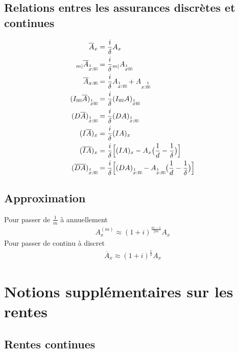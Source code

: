 \documentclass[11pt,french]{report}
\makeatletter
\DeclareRobustCommand{\annuity}[1]{%
\def\arraystretch{0}%
\setlength\arraycolsep{.7pt}%
\setlength\arrayrulewidth{.3pt}%
\begin{array}[b]{@{}c|}\hline
\\[\arraycolsep]%
\scriptstyle #1%
\end{array}%
}
\newcommand{\indiceGauche}[2]{{\vphantom{#2}}_{#1}#2}
\makeatother
\begin{document}
\section{Relations entres les assurances discrètes et continues}
\begin{align*}
\overline{A}_x &= \frac{i}{\delta}A_x \\
\indiceGauche{m|}{\overline{A}}_{\overset{1}{x}:\annuity{n}} &= \frac{i}{\delta} \indiceGauche{m|}{A}_{\overset{1}{x}\annuity{n}} \\
\overline{A}_{x:\annuity{n}} &= \frac{i}{\delta} A_{\overset{1}{x}:\annuity{n}} + A_{x:\overset{1}{\annuity{n}}} \\
(I_{\annuity{m}}\overline{A})_{\overset{1}{x}\annuity{n}} &= \frac{i}{\delta} (I_{\annuity{m}}A)_{\overset{1}{x}\annuity{n}} \\
(D\overline{A})_{\overset{1}{x}:\annuity{n}} &= \frac{i}{\delta}(DA)_{\overset{1}{x}:\annuity{n}} \\
(I\overline{A})_x &= \frac{i}{\delta}(IA)_x \\
(\overline{IA})_x &= \frac{i}{\delta}\Big[ (IA)_x - A_x\big( \frac{1}{d} - \frac{1}{\delta}\big) \Big]  \\
(\overline{DA})_{\overset{1}{x}:\annuity{n}} &= \frac{i}{\delta}\Big[ (DA)_{\overset{1}{x}:\annuity{n}} - A_{\overset{1}{x}:\annuity{n}}\big( \frac{1}{d} - \frac{1}{\delta}\big) \Big]  \\
\end{align*}

\section{Approximation}
Pour passer de $\frac{1}{m}$ à annuellement
\begin{align*}
A_x^{(m)} \approx (1+i)^{\frac{m-1}{2m}}A_x
\end{align*}
Pour passer de continu à discret
\begin{align*}
\overline{A}_x \approx (1+i)^{\frac{1}{2}}A_x
\end{align*}

\chapter{Notions supplémentaires sur les rentes}

\section{Rentes continues}
\end{document}
